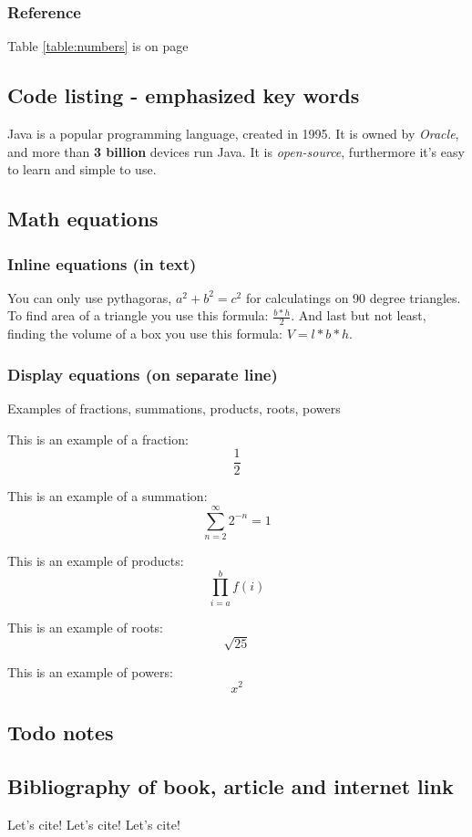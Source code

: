 \documentclass{article}
\begin{document}
            \subsubsection{Reference}
            Table \ref{table:numbers} is on page \pageref{table:numbers}
        
        \newpage
        \subsection{Code listing - emphasized key words}
        Java is a popular programming language, created in 1995. It is owned by \emph{Oracle}, and more than \textbf{3 billion} devices run Java. It is \emph{open-source}, furthermore it's easy to learn and simple to use.
        
        \newpage
        \subsection{Math equations}

        \subsubsection{Inline equations (in text)}
        You can only use pythagoras, \(a^2 + b^2 = c^2\) for calculatings on 90 degree triangles. To find area of a triangle you use this formula: \begin{math} \frac{b * h}{2} \end{math}. And last but not least, finding the volume of a box you use this formula: $V = l * b * h $. 

        \subsubsection{Display equations (on separate line)}
        Examples of fractions, summations, products, roots, powers
        
        This is an example of a fraction: 
        \[\frac{1}{2}\]
        
        This is an example of a summation: 
        \[\sum_{n=2}^{\infty} 2^{-n} = 1 \]

        This is an example of products:
        \[ \prod_{i=a}^{b} f(i) \]

        This is an example of roots:
        \[ \sqrt{25} \]

        This is an example of powers:
        \[ x^2 \]

        \subsection{Todo notes}

        \newpage
        \subsection{Bibliography of book, article and internet link}
        
        Let's cite! \cite{Clear} 
        Let's cite! \cite{latexcompanion}
        Let's cite! \cite{knuthwebsite}
        \printbibliography
\end{document}
